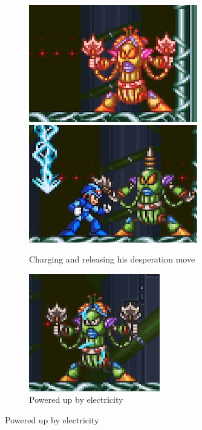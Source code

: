 \begin{figure}[htp]
	\ContinuedFloat
	\centering
	\begin{subfigure}{\linewidth}
		\centering
		\includegraphics[width=0.4\linewidth]{figures/X2/Wire_sponge/Sponge_phase2.jpg}
		\includegraphics[width=0.4\linewidth]{figures/X2/Wire_sponge/Sponge_DM.jpg}
		\caption{Charging and releasing his desperation move}
	\end{subfigure}
	\begin{subfigure}{0.4\linewidth}
		\centering
		\includegraphics[width=\linewidth]{figures/X2/Wire_sponge/Sponge_charged.jpg}
		\caption{Powered up by electricity}
	\end{subfigure}

\end{figure}
